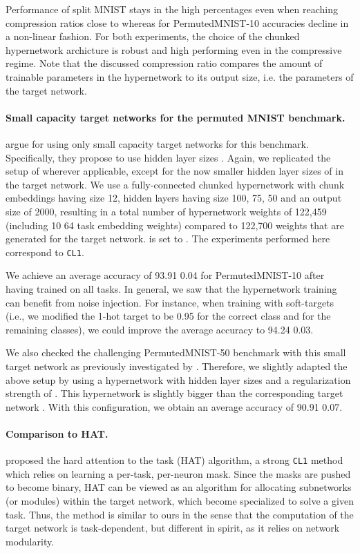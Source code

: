 \documentclass{article}
\begin{document}
Performance of split MNIST stays in the high  percentages even when reaching compression ratios close to  whereas for PermutedMNIST-10 accuracies decline in a non-linear fashion. For both experiments, the choice of the chunked hypernetwork archicture is robust and high performing even in the compressive regime. Note that the discussed compression ratio compares the amount of trainable parameters in the hypernetwork to its output size, i.e. the parameters of the target network.

\paragraph{Small capacity target networks for the permuted MNIST benchmark.} \citet{improved:vcl} argue for using only small capacity target networks for this benchmark. Specifically, they propose to use hidden layer sizes . Again, we replicated the setup of \citet{van_de_ven_three_2019} wherever applicable, except for the now smaller hidden layer sizes of  in the target network. We use a fully-connected chunked hypernetwork with chunk embeddings  having size 12, hidden layers having size 100, 75, 50 and an output size of 2000, resulting in a total number of hypernetwork weights of 122,459 (including 10  64 task embedding weights) compared to 122,700 weights that are generated for the target network.   is set to . The experiments performed here correspond to \texttt{CL1}.

We achieve an average accuracy of 93.91  0.04 for PermutedMNIST-10 after having trained on all tasks. In general, we saw that the hypernetwork training can benefit from noise injection. For instance, when training with soft-targets (i.e., we modified the 1-hot target to be 0.95 for the correct class and  for the remaining classes), we could improve the average accuracy to 94.24  0.03.

We also checked the challenging PermutedMNIST-50 benchmark with this small target network as previously investigated by \citet{cl:kronecker:laplace}. Therefore, we slightly adapted the above setup by using a hypernetwork with hidden layer sizes  and a regularization strength of . This hypernetwork is slightly bigger than the corresponding target network . With this configuration, we obtain an average accuracy of 90.91  0.07.

\paragraph{Comparison to HAT.} \citet{pmlr-v80-serra18a} proposed the hard attention to the task (HAT) algorithm, a strong \texttt{CL1} method which relies on learning a per-task, per-neuron mask. Since the masks are pushed to become binary, HAT can be viewed as an algorithm for allocating subnetworks (or modules) within the target network, which become specialized to solve a given task. Thus, the method is similar to ours in the sense that the computation of the target network is task-dependent, but different in spirit, as it relies on network modularity.
\end{document}
